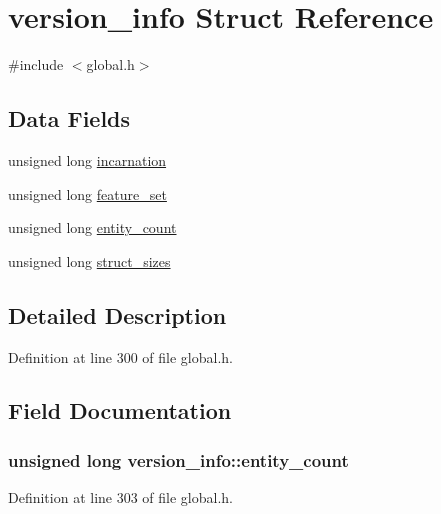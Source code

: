 \hypertarget{structversion__info}{\section{version\+\_\+info Struct Reference}
\label{structversion__info}
}


{\ttfamily \#include $<$global.\+h$>$}

\subsection*{Data Fields}
\begin{DoxyCompactItemize}
\item 
unsigned long \hyperlink{structversion__info_a3cd43ee1186d0ba5175b3741fee41a22}{incarnation}
\item 
unsigned long \hyperlink{structversion__info_a30b026e5e6a7d440c7e94cdc79d19d1c}{feature\+\_\+set}
\item 
unsigned long \hyperlink{structversion__info_adfd49b59efa4353bbb8d825e1c1cc44a}{entity\+\_\+count}
\item 
unsigned long \hyperlink{structversion__info_acefd1dc1f2fcfb2d0a7ece599eeb8627}{struct\+\_\+sizes}
\end{DoxyCompactItemize}


\subsection{Detailed Description}


Definition at line 300 of file global.\+h.



\subsection{Field Documentation}
\hypertarget{structversion__info_adfd49b59efa4353bbb8d825e1c1cc44a}{
\subsubsection[{entity\+\_\+count}]{\setlength{\rightskip}{0pt plus 5cm}unsigned long version\+\_\+info\+::entity\+\_\+count}}\label{structversion__info_adfd49b59efa4353bbb8d825e1c1cc44a}


Definition at line 303 of file global.\+h.



